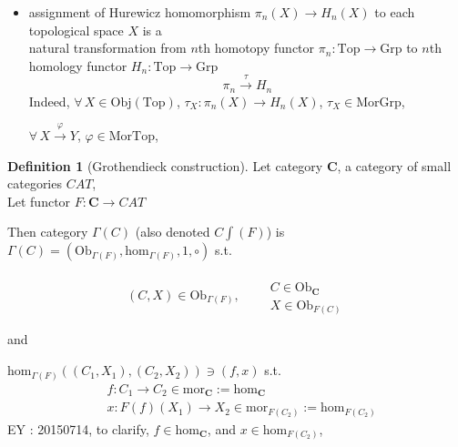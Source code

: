 \documentclass[twoside,landscape,10pt]{amsart}
\theoremstyle{plain}
\theoremstyle{definition}
\newtheorem{definition}{Definition}
\theoremstyle{remark}
\begin{document}
\begin{multicols*}{2}
\begin{itemize}
\item assignment of Hurewicz homomorphism $\pi_n(X) \to H_n(X)$ to each topological space $X$ is a \\
natural transformation from $n$th homotopy functor $\pi_n : \text{Top} \to \text{Grp}$ to $n$th homology functor $H_n:\text{Top} \to \text{Grp}$
\[
\pi_n \xrightarrow{ \tau} H_n
\]
Indeed, $\forall \, X \in \text{Obj}(\text{Top})$, $\tau_X : \pi_n(X) \to H_n(X)$, $\tau_X \in \text{Mor}\text{Grp}$,

$\forall \, X \xrightarrow{ \varphi } Y$, $\varphi \in \text{Mor}\text{Top}$,



\end{itemize}




\begin{definition}[Grothendieck construction] Let category $\mathbf{C}$, a category of small categories $CAT$, \\
Let functor $F: \mathbf{C} \to CAT$

Then category $\Gamma(C)$ (also denoted $C\int (F)$) is $\Gamma(C) = (\text{Ob}_{\Gamma(F)} , \text{hom}_{\Gamma(F)}, 1, \circ )$ s.t.

\[
(C,X) \in \text{Ob}_{\Gamma(F)} , \quad \, \begin{aligned} & \quad \\
  & C \in \text{Ob}_{\mathbf{C}} \\
  & X \in \text{Ob}_{F(C)} \end{aligned}
\]
  
and 

$\text{hom}_{\Gamma(F)}((C_1, X_1),(C_2,X_2)) \ni (f,x)$ s.t. 
\[
\begin{aligned}
  & f:C_1 \to C_2 \in \text{mor}_{\mathbf{C}} := \text{hom}_{\mathbf{C}} \\ 
  & x: F(f)(X_1) \to X_2 \in \text{mor}_{F(C_2)} := \text{hom}_{F(C_2)}
\end{aligned}
\]
EY : 20150714, to clarify, $f \in \text{hom}_{\mathbf{C}}$, and $x \in \text{hom}_{F(C_2)}$, 


\end{definition}
\end{multicols*}
\end{document}
